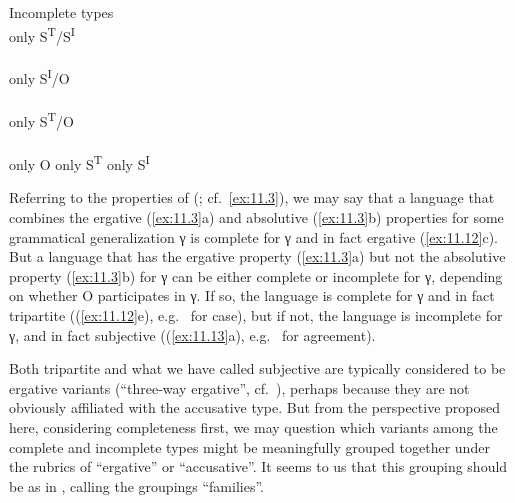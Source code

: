 \documentclass[output=paper]{langsci/langscibook}
\begin{document}
\ea%
    \label{ex:11.13}Incomplete types\\
    \ea only S\textsuperscript{T}/S\textsuperscript{I}
         \\
         \\
         
	\ex only S\textsuperscript{I}/O
         \\
         \\
         
	\ex only S\textsuperscript{T}/O
         \\
         \\
         
    \ex only O                    \tab{} 
    \ex only S\textsuperscript{T} \tab{} 
    \ex only S\textsuperscript{I} \tab{} 
	\z
\z

Referring to the  properties of \citeauthor{Deal2015}
(\citeyear{Deal2015}; cf.\ \eqref{ex:11.3}), we may say that a language that
combines the ergative (\ref{ex:11.3}a) and absolutive (\ref{ex:11.3}b)
properties for some grammatical generalization γ is complete for γ and in fact
ergative (\ref{ex:11.12}c).  But a language that has the ergative property
(\ref{ex:11.3}a) but not the absolutive property (\ref{ex:11.3}b) for γ can be
either complete or incomplete for γ, depending on whether O participates in γ.
If so, the language is complete for γ and in fact tripartite
((\ref{ex:11.12}e), e.g.\  for case), but if not, the language is
incomplete for γ, and in fact subjective ((\ref{ex:11.13}a), e.g.\
 for agreement).

Both tripartite and what we have called subjective are typically considered to
be ergative variants (\enquote{three-way ergative}, cf.\ \citealt{Deal2015}),
perhaps because they are not obviously affiliated with the accusative type. But
from the perspective proposed here, considering completeness first, we may
question which variants among the complete and incomplete types might be
meaningfully grouped together under the rubrics of \enquote{ergative} or
\enquote{accusative}.  It seems to us that this grouping should be as in ,
calling the groupings \enquote{families}.
\end{document}
